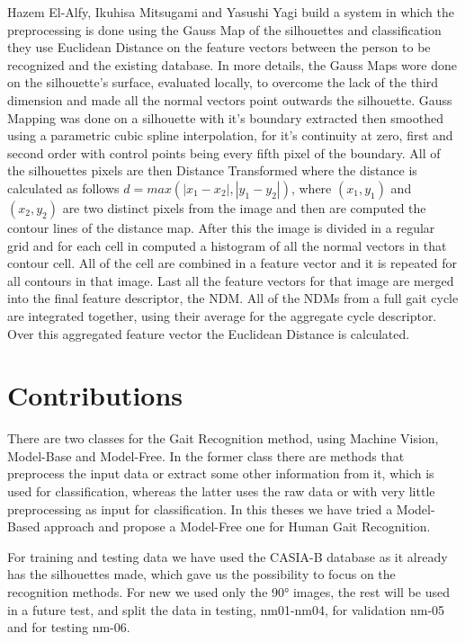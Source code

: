 \documentclass[12pt]{article}
\theoremstyle{definition}
\begin{document}
	Hazem El-Alfy, Ikuhisa Mitsugami and Yasushi Yagi \cite{gait-with-curvature-map} build a system in which the preprocessing is done using the Gauss Map of the silhouettes and classification they use Euclidean Distance on the feature vectors between the person to be recognized and the existing database. In more details, the Gauss Maps wore done on the silhouette's surface, evaluated locally, to overcome the lack of the third dimension and made all the normal vectors point outwards the silhouette. Gauss Mapping was done on a silhouette with it's boundary extracted then smoothed using a parametric cubic spline interpolation, for it's continuity at zero, first and second order with control points being every fifth pixel of the boundary. All of the silhouettes pixels are then Distance Transformed where the distance is calculated as follows $d=max(|x_1-x_2|, |y_1-y_2|)$, where $(x_1, y_1)$ and $(x_2, y_2)$ are two distinct pixels from the image and then are computed the contour lines of the distance map. After this the image is divided in a regular grid and for each cell in computed a histogram of all the normal vectors in that contour cell. All of the cell are combined in a feature vector and it is repeated for all contours in that image. Last all the feature vectors for that image are merged into the final feature descriptor, the NDM. All of the NDMs from a full gait cycle are integrated together, using their average for the aggregate cycle descriptor. Over this aggregated feature vector the Euclidean Distance is calculated.
	
	\newpage
	
	\section{Contributions}
	\vspace{1cm}
	
	There are two classes for the Gait Recognition method, using Machine Vision, Model-Base and Model-Free. In the former class there are methods that preprocess the input data or extract some other information from it, which is used for classification, whereas the latter uses the raw data or with very little preprocessing as input for classification. In this theses we have tried a Model-Based approach and propose a Model-Free one for Human Gait Recognition.
	
	For training and testing data we have used the CASIA-B database \cite{casia1}\cite{casia2}\cite{casia3} as it already has the silhouettes made, which gave us the possibility to focus on the recognition methods. For new we used only the \ang{90} images, the rest will be used in a future test, and split the data in testing, nm01-nm04, for validation nm-05 and for testing nm-06.
	
\end{document}
